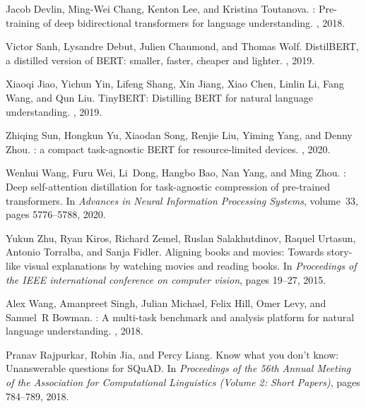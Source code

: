 \documentclass{article}
\begin{document}
  
\begin{thebibliography}{10}  
  
Jacob Devlin, Ming-Wei Chang, Kenton Lee, and Kristina Toutanova.  
: Pre-training of deep bidirectional transformers for language understanding.  
, 2018.  
  
Victor Sanh, Lysandre Debut, Julien Chaumond, and Thomas Wolf.  
\newblock Distil{BERT}, a distilled version of {BERT}: smaller, faster, cheaper and lighter.  
, 2019.  
  
Xiaoqi Jiao, Yichun Yin, Lifeng Shang, Xin Jiang, Xiao Chen, Linlin Li, Fang Wang, and Qun Liu.  
\newblock Tiny{BERT}: Distilling {BERT} for natural language understanding.  
, 2019.  
  
Zhiqing Sun, Hongkun Yu, Xiaodan Song, Renjie Liu, Yiming Yang, and Denny Zhou.  
: a compact task-agnostic {BERT} for resource-limited devices.  
, 2020.  
  
Wenhui Wang, Furu Wei, Li~Dong, Hangbo Bao, Nan Yang, and Ming Zhou.  
: Deep self-attention distillation for task-agnostic compression of pre-trained transformers.  
\newblock In {\em Advances in Neural Information Processing Systems}, volume~33, pages 5776--5788, 2020.  
  
Yukun Zhu, Ryan Kiros, Richard Zemel, Ruslan Salakhutdinov, Raquel Urtasun, Antonio Torralba, and Sanja Fidler.  
\newblock Aligning books and movies: Towards story-like visual explanations by watching movies and reading books.  
\newblock In {\em Proceedings of the IEEE international conference on computer vision}, pages 19--27, 2015.  
  
Alex Wang, Amanpreet Singh, Julian Michael, Felix Hill, Omer Levy, and Samuel~R Bowman.  
: A multi-task benchmark and analysis platform for natural language understanding.  
, 2018.  
  
Pranav Rajpurkar, Robin Jia, and Percy Liang.  
\newblock Know what you don't know: Unanswerable questions for {SQuAD}.  
\newblock In {\em Proceedings of the 56th Annual Meeting of the Association for Computational Linguistics (Volume 2: Short Papers)}, pages 784--789, 2018.  
  
\end{thebibliography}  
  
\end{document}
